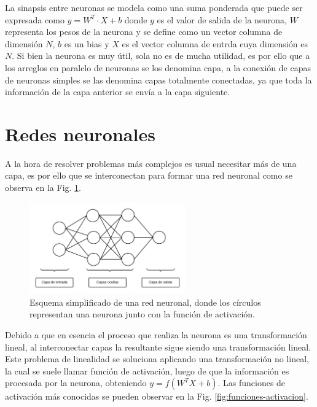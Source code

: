 La sinapsis entre neuronas se modela como una suma ponderada que puede ser expresada como $y =W^T \cdot X + b$ donde $y$ es el valor de salida de la neurona,
$W$ representa los pesos de la neurona y se define como un vector columna de dimensión $N$, $b$ es un bias y $X$ es el vector columna de entrda cuya dimensión es $N$. Si bien la neurona es muy útil, sola no es de mucha utilidad, es por ello que a los arreglos en paralelo de neuronas se los denomina capa, a la conexión de capas de neuronas simples se las denomina capas totalmente conectadas, ya que toda la información de la capa anterior se envía a la capa siguiente.

\section{Redes neuronales}

A la hora de resolver problemas más complejos es usual necesitar más de una capa, es por ello que se interconectan para formar una red neuronal como se observa en la Fig. \ref{fig:esquema-redes}.

\begin{figure}[bth]
    \centering
    \includegraphics[width=0.6\textwidth]{imgs/Redes-esquema.png}
    \caption{Esquema simplificado de una red neuronal, donde los círculos representan una neurona junto con la función de activación.}
    \label{fig:esquema-redes}
\end{figure}

Debido a que en esencia el proceso que realiza la neurona es una transformación lineal, al interconectar capas la resultante sigue siendo una transformación lineal.
Este problema de linealidad se soluciona aplicando una transformación no lineal, la cual se suele llamar función de activación,
luego de que la información es procesada por la neurona, obteniendo $y= f(W^T X + b)$. Las funciones de activación más conocidas se pueden observar en la Fig. \ref{fig:funciones-activacion}.

